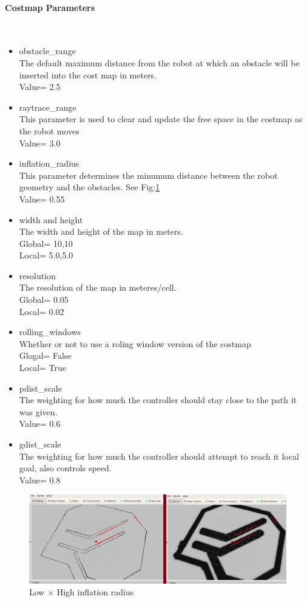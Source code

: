 \documentclass[10pt,journal,compsoc]{IEEEtran}
\newcommand{\subsubsubsection}[1]{\paragraph{#1}\mbox{}\\}
\begin{document}
\subsubsubsection{Costmap Parameters}
\begin{itemize}
  \item obstacle\_range\\
    The default maximum distance from the robot at which an obstacle will be inserted into the cost map in meters.\\
    Value= 2.5\\

  \item raytrace\_range\\
    This parameter is used to clear and update the free space in the costmap as the robot moves\\
    Value= 3.0  \\
  \item inflation\_radius\\
    This parameter determines the minumum distance between the robot geometry and the obstacles. See
    Fig:\ref{fig:inflation}\\
    Value= 0.55
  \item width and height\\
    The width and height of the map in meters.\\
    Global= 10,10\\
    Local= 5.0,5.0
 \item resolution\\
   The resolution of the map in meteres/cell.\\
    Global= 0.05\\
    Local= 0.02
  \item rolling\_windows\\
    Whether or not to use a roling window version of the costmap\\
    Glogal= False\\
    Local= True
  \item pdist\_scale\\
    The weighting for how much the controller should stay close to the path it was given.\\
    Value= 0.6
  \item gdist\_scale\\
    The weighting for how much the controller should attempt to reach it local goal, also controls speed.\\
    Value= 0.8


\end{itemize}

\begin{figure}[thpb]
      \centering
      \includegraphics[width=\linewidth]{costmap-with-without-inflation.png}
      \caption{Low $\times$ High inflation radius}
      \label{fig:inflation}
\end{figure}
\end{document}
